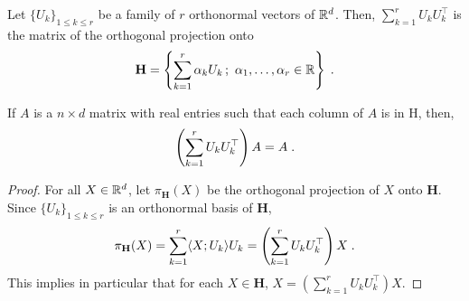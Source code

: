\begin{lemma}
\label{lem:ortho:proj}
Let $\{U_k\}_{1\leqslant k \leqslant r}$ be a family of $r$ orthonormal vectors of $\mathbb{R}^d$.
Then, $\sum_{k=1}^{r} U_k U_k^\top$ is the matrix of the orthogonal projection onto 
$$
\mathbf{H}=\left\{\sum_{k=1}^r \alpha_k U_k\,; \ \alpha_1,\ldots,\alpha_r \in \rset\right\}\eqsp.
$$ 
\end{lemma}
\begin{remark}
If $A$ is a $n\times d$ matrix with real entries such that each column of $A$ is in $\mathrm{H}$, then,
$$
\left(\sum_{k=1}^r U_k U_k^\top\right) A = A\;.
$$
\end{remark}
\begin{proof}
For all $X\in\mathbb{R}^d$, let $\pi_\mathbf{H}(X)$ be the orthogonal projection of $X$ onto $\mathbf{H}$. Since $\{U_k\}_{1\leqslant k \leqslant r}$  is an orthonormal basis of $\mathbf{H}$,
$$
\pi_\mathbf{H}(X)=\sum_{k=1}^{r} \langle X; U_k\rangle U_k=\left(\sum_{k=1}^{r} U_k U_k^\top\right)X\;.
$$
This implies in particular that for each $X \in \mathbf{H}$, $X=\left(\sum_{k=1}^{r} U_k U_k^\top\right)X$. %
\end{proof}

